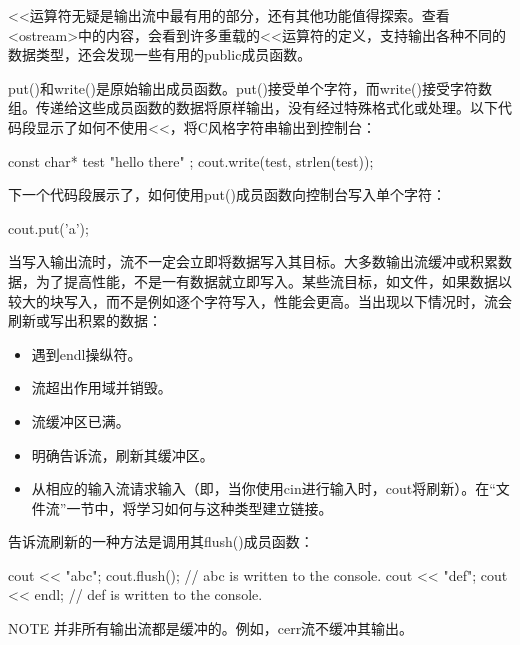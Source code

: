 
<{}<运算符无疑是输出流中最有用的部分，还有其他功能值得探索。查看<ostream>中的内容，会看到许多重载的<{}<运算符的定义，支持输出各种不同的数据类型，还会发现一些有用的public成员函数。


put()和write()是原始输出成员函数。put()接受单个字符，而write()接受字符数组。传递给这些成员函数的数据将原样输出，没有经过特殊格式化或处理。以下代码段显示了如何不使用<{}<，将C风格字符串输出到控制台：

\begin{cpp}
const char* test { "hello there" };
cout.write(test, strlen(test));
\end{cpp}

下一个代码段展示了，如何使用put()成员函数向控制台写入单个字符：

\begin{cpp}
cout.put('a');
\end{cpp}


当写入输出流时，流不一定会立即将数据写入其目标。大多数输出流缓冲或积累数据，为了提高性能，不是一有数据就立即写入。某些流目标，如文件，如果数据以较大的块写入，而不是例如逐个字符写入，性能会更高。当出现以下情况时，流会刷新或写出积累的数据：

\begin{itemize}
\item
遇到endl操纵符。

\item
流超出作用域并销毁。

\item
流缓冲区已满。

\item
明确告诉流，刷新其缓冲区。

\item
从相应的输入流请求输入（即，当你使用cin进行输入时，cout将刷新）。在“文件流”一节中，将学习如何与这种类型建立链接。
\end{itemize}

告诉流刷新的一种方法是调用其flush()成员函数：

\begin{cpp}
cout << "abc";
cout.flush(); // abc is written to the console.
cout << "def";
cout << endl; // def is written to the console.
\end{cpp}

\begin{myNotic}{NOTE}
并非所有输出流都是缓冲的。例如，cerr流不缓冲其输出。
\end{myNotic}

